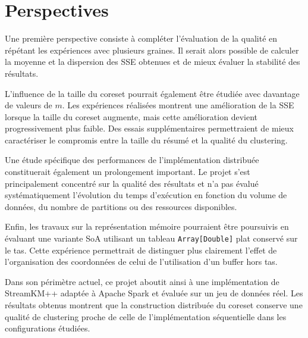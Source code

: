 \section{Perspectives}

Une première perspective consiste à compléter l'évaluation de la qualité en répétant les expériences avec plusieurs graines. Il serait alors possible de calculer la moyenne et la dispersion des SSE obtenues et de mieux évaluer la stabilité des résultats.

L'influence de la taille du coreset pourrait également être étudiée avec davantage de valeurs de \(m\). Les expériences réalisées montrent une amélioration de la SSE lorsque la taille du coreset augmente, mais cette amélioration devient progressivement plus faible. Des essais supplémentaires permettraient de mieux caractériser le compromis entre la taille du résumé et la qualité du clustering.

Une étude spécifique des performances de l'implémentation distribuée constituerait également un prolongement important. Le projet s'est principalement concentré sur la qualité des résultats et n'a pas évalué systématiquement l'évolution du temps d'exécution en fonction du volume de données, du nombre de partitions ou des ressources disponibles.

Enfin, les travaux sur la représentation mémoire pourraient être poursuivis en évaluant une variante SoA utilisant un tableau \texttt{Array[Double]} plat conservé sur le tas. Cette expérience permettrait de distinguer plus clairement l'effet de l'organisation des coordonnées de celui de l'utilisation d'un buffer hors tas.

Dans son périmètre actuel, ce projet aboutit ainsi à une implémentation de StreamKM++ adaptée à Apache Spark et évaluée sur un jeu de données réel. Les résultats obtenus montrent que la construction distribuée du coreset conserve une qualité de clustering proche de celle de l'implémentation séquentielle dans les configurations étudiées.
